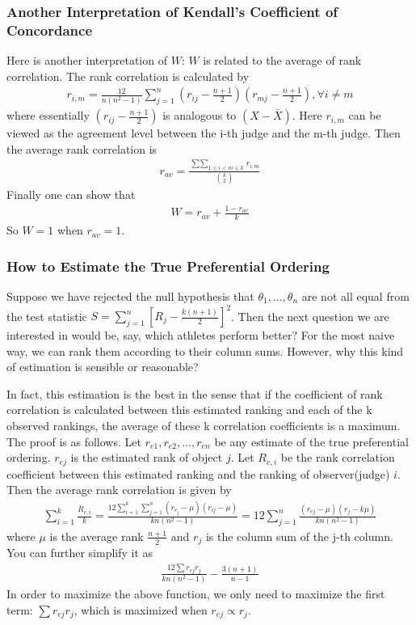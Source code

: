 \documentclass[twoside]{article}
\begin{document}
	\subsubsection{Another Interpretation of Kendall's Coefficient of Concordance}
	Here is another interpretation of $W$: $W$ is related to the average of rank correlation. The rank correlation is calculated by
	\begin{align*}
		r_{i, m} = \frac{12}{n (n^2 - 1)} \sum_{j=1}^{n} \left( r_{ij} - \frac{n+1}{2} \right) \left( r_{mj} - \frac{n+1}{2} \right), \forall i \neq m
	\end{align*}
	where essentially $\left( r_{ij} - \frac{n+1}{2} \right)$ is analogous to $\left( X - \bar{X} \right)$. Here $r_{i, m}$ can be viewed as the agreement level between the i-th judge and the m-th judge. Then the average rank correlation is
	\begin{align*}
		r_{av} = \frac{\mathop{\sum \sum}_{1 \leqslant i < m \leqslant k} r_{i, m}}{\binom{k}{2}}
	\end{align*}
	Finally one can show that
	\begin{align*}
		W = r_{av} + \frac{1 - r_{av}}{k}
	\end{align*}
	So $W = 1$ when $r_{av} = 1$. 
	\subsubsection{How to Estimate the True Preferential Ordering}
	Suppose we have rejected the null hypothesis that $\theta_1, ..., \theta_n$ are not all equal from the test statistic $S = \sum_{j=1}^{n} \left[ R_j - \frac{k(n+1)}{2} \right]^2$. Then the next question we are interested in would be, say, which athletes perform better? For the most naive way, we can rank them according to their column sums. However, why this kind of estimation is sensible or reasonable? 
	
	In fact, this estimation is the best in the sense that if the coefficient of rank correlation is calculated between this estimated ranking and each of the k observed rankings, the average of these k correlation coefficients is a maximum. The proof is as follows. Let $r_{e1}, r_{e2}, ..., r_{en}$ be any estimate of the true preferential ordering. $r_{ej}$ is the estimated rank of object $j$. Let $R_{e,i}$ be the rank correlation coefficient between this estimated ranking and the ranking of observer(judge) $i$. Then the average rank correlation is given by
	\begin{align*}
		\sum_{i=1}^{k} \frac{R_{e,i}}{k} = \frac{12 \sum_{i=1}^{k} \sum_{j=1}^{n} \left( r_{e_j} - \mu \right) \left( r_{ij} - \mu \right)}{kn(n^2-1)} = 12 \sum_{j=1}^{n} \frac{\left(r_{ej} - \mu \right) \left( r_j - k \mu \right)}{kn (n^2-1)}
	\end{align*}
	where $\mu$ is the average rank $\frac{n+1}{2}$ and $r_j$ is the column sum of the j-th column. You can further simplify it as
	\begin{align*}
		\frac{12 \sum r_{ej} r_j}{k n (n^2 - 1)} - \frac{3(n+1)}{n-1}
	\end{align*}
	In order to maximize the above function, we only need to maximize the first term: $\sum r_{ej} r_j$, which is maximized when $r_{ej} \propto r_j$.
	
\end{document}
